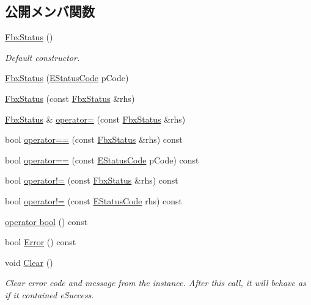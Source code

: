 \subsection*{公開メンバ関数}
\begin{DoxyCompactItemize}
\item 
\hyperlink{class_fbx_status_aab737630a70f9f68c4cf4ee136b42971}{Fbx\+Status} ()
\begin{DoxyCompactList}\small\item\em Default constructor. \end{DoxyCompactList}\item 
\hyperlink{class_fbx_status_aec4436e434f39c73dd3e4dfb784c14b0}{Fbx\+Status} (\hyperlink{class_fbx_status_a6a631d5d95b28e31a19aabd5f5809ecc}{E\+Status\+Code} p\+Code)
\item 
\hyperlink{class_fbx_status_a6e535b54d854836d79e5a0d4ccac3fd7}{Fbx\+Status} (const \hyperlink{class_fbx_status}{Fbx\+Status} \&rhs)
\item 
\hyperlink{class_fbx_status}{Fbx\+Status} \& \hyperlink{class_fbx_status_a014bcc7b3ccd713f98f87d9eac77b579}{operator=} (const \hyperlink{class_fbx_status}{Fbx\+Status} \&rhs)
\item 
bool \hyperlink{class_fbx_status_a7dfb7606bdb3fb0df2cceb9edc01c4df}{operator==} (const \hyperlink{class_fbx_status}{Fbx\+Status} \&rhs) const
\item 
bool \hyperlink{class_fbx_status_aaee475035201b4873ce60261e8a92072}{operator==} (const \hyperlink{class_fbx_status_a6a631d5d95b28e31a19aabd5f5809ecc}{E\+Status\+Code} p\+Code) const
\item 
bool \hyperlink{class_fbx_status_a832f10e5d0469a191a0cd845c60525b3}{operator!=} (const \hyperlink{class_fbx_status}{Fbx\+Status} \&rhs) const
\item 
bool \hyperlink{class_fbx_status_a1f05b05e754a2a8f763f567b0b458010}{operator!=} (const \hyperlink{class_fbx_status_a6a631d5d95b28e31a19aabd5f5809ecc}{E\+Status\+Code} rhs) const
\item 
\hyperlink{class_fbx_status_af364552fc78b2b02f09bc7dcccbbbe92}{operator bool} () const
\item 
bool \hyperlink{class_fbx_status_ab698013e2bdef14baef8842d0dfa00ea}{Error} () const
\item 
void \hyperlink{class_fbx_status_ae99f70d26d755bb65af9593cf515a4ed}{Clear} ()
\begin{DoxyCompactList}\small\item\em Clear error code and message from the instance. After this call, it will behave as if it contained e\+Success. \end{DoxyCompactList}\item 

\end{DoxyCompactItemize}
